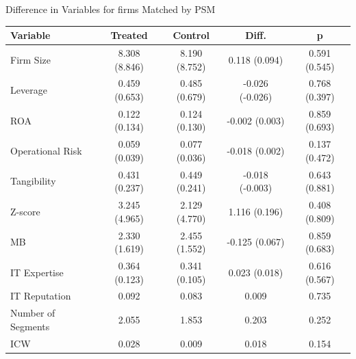 \documentclass[13pt]{beamer}
\begin{document}
\begin{frame}
  {Difference in Variables for firms Matched by PSM}
  \scriptsize

  \begin{table}[ht]
    \centering
    \begin{tabular}{@{}lcccc@{}}
      \toprule
      Variable           & Treated       & Control       & Diff.           & p             \\
      \midrule
      Firm Size          & 8.308 (8.846) & 8.190 (8.752) & 0.118 (0.094)   & 0.591 (0.545) \\
      Leverage           & 0.459 (0.653) & 0.485 (0.679) & -0.026 (-0.026) & 0.768 (0.397) \\
      ROA                & 0.122 (0.134) & 0.124 (0.130) & -0.002 (0.003)  & 0.859 (0.693) \\
      Operational Risk   & 0.059 (0.039) & 0.077 (0.036) & -0.018 (0.002)  & 0.137 (0.472) \\
      Tangibility        & 0.431 (0.237) & 0.449 (0.241) & -0.018 (-0.003) & 0.643 (0.881) \\
      Z-score            & 3.245 (4.965) & 2.129 (4.770) & 1.116 (0.196)   & 0.408 (0.809) \\
      MB                 & 2.330 (1.619) & 2.455 (1.552) & -0.125 (0.067)  & 0.859 (0.683) \\
      IT Expertise       & 0.364 (0.123) & 0.341 (0.105) & 0.023 (0.018)   & 0.616 (0.567) \\
      IT Reputation      & 0.092         & 0.083         & 0.009           & 0.735         \\
      Number of Segments & 2.055         & 1.853         & 0.203           & 0.252         \\
      ICW                & 0.028         & 0.009         & 0.018           & 0.154         \\
      \bottomrule
    \end{tabular}
  \end{table}
\end{frame}
\end{document}
